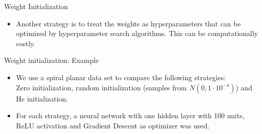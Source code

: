\begin{vbframe}{Weight Initialization}
\begin{itemize}
    \item Another strategy is to treat the weights as hyperparameters that can be optimized by hyperparameter search algorithms. This can be computationally costly. 
  \end{itemize}
\end{vbframe}

\begin{vbframe}{Weight initialization: Example}
\begin{itemize}
\item We use a spiral planar data set to compare the following strategies: \\
Zero initialization, random initialization (samples from $N\left(0, 1\cdot 10^{-4}\right)$) and He initialization. 
\item For each strategy, a neural network with one hidden layer with 100 units, ReLU activation and Gradient Descent as optimizer was used. 
\end{itemize}
  \begin{figure}
  \vspace{-0.5cm}
    \centering

\end{figure}
\end{vbframe}

